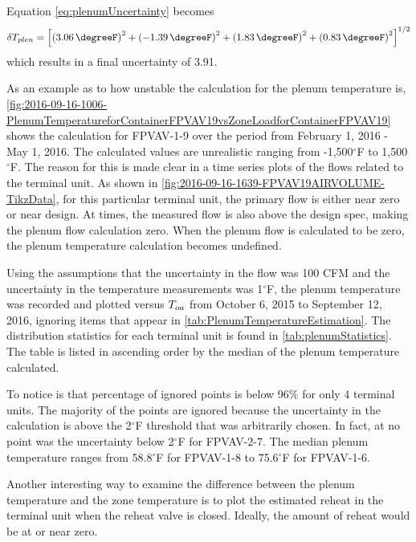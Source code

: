 Equation \ref{eq:plenumUncertainty} becomes
\begin{equation}\label{eq:plenumUncertainty2}
    \delta T_{plen} = \left[\left(  \SI{3.06}{\degreeF}  \right)^2  +\left( \SI{-1.39}{\degreeF}  \right)^2 +  \left( \SI{1.83}{\degreeF} \right)^2 + \left(\SI{0.83}{\degreeF}  \right)^2  \right]^{1/2}
\end{equation}
which results in a final uncertainty of \SI{3.91}{\degreeF}.

As an example as to how unstable the calculation for the plenum
temperature is, \figref{}
\ref{fig:2016-09-16-1006-PlenumTemperatureforContainerFPVAV19vsZoneLoadforContainerFPVAV19}
shows the calculation for FPVAV-1-9 over the period from February 1,
2016 - May 1, 2016. The calculated values are unrealistic ranging from
-1,500\(^\circ\)F to 1,500\(^\circ\)F. The reason for this is made clear
in a time series plots of the flows related to the terminal unit. As
shown in \figref{} \ref{fig:2016-09-16-1639-FPVAV19AIRVOLUME-TikzData},
for this particular terminal unit, the primary flow is either near zero
or near design. At times, the measured flow is also above the design
spec, making the plenum flow calculation zero. When the plenum flow is
calculated to be zero, the plenum temperature calculation becomes
undefined.

Using the assumptions that the uncertainty in the flow was 100 CFM and
the uncertainty in the temperature measurements was 1\(^\circ\)F, the
plenum temperature was recorded and plotted versus \(T_{oa}\) from October
6, 2015 to September 12, 2016, ignoring items that appear in \tableref{}
\ref{tab:PlenumTemperatureEstimation}. The distribution statistics for
each terminal unit is found in \tableref{} \ref{tab:plenumStatistics}.
The table is listed in ascending order by the median of the plenum
temperature calculated.

To notice is that percentage of ignored points is below 96\% for only 4
terminal units.  The majority of the points are ignored because the
uncertainty in the calculation is above the 2\(^\circ\)F threshold that
was arbitrarily chosen.  In fact, at no point was the uncertainty below
2\(^\circ\)F for FPVAV-2-7.  The median plenum temperature ranges from
58.8\(^\circ\)F for FPVAV-1-8 to 75.6\(^\circ\)F for FPVAV-1-6.

Another interesting way to examine the difference between the plenum
temperature and the zone temperature is to plot the estimated reheat in
the terminal unit when the reheat valve is closed.  Ideally, the amount
of reheat would be at or near zero. 

